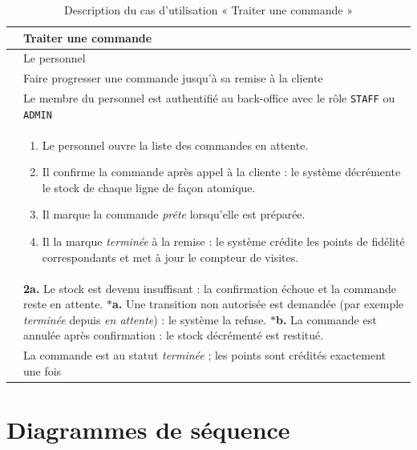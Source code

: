 \begin{table}[H]
\centering
\caption{Description du cas d'utilisation « Traiter une commande »}
\label{tab:cu-traiter}
\begin{tabularx}{\textwidth}{L{3.1cm} X}
\toprule
{} & Traiter une commande \\
\midrule
{} & Le personnel \\
 & Faire progresser une commande jusqu'à sa remise à la
cliente \\
 & Le membre du personnel est authentifié au back-office
avec le rôle \texttt{STAFF} ou \texttt{ADMIN} \\
 &
\begin{enumerate}[leftmargin=*,nosep]
  \item Le personnel ouvre la liste des commandes en attente.
  \item Il confirme la commande après appel à la cliente : le système
  décrémente le stock de chaque ligne de façon atomique.
  \item Il marque la commande \textit{prête} lorsqu'elle est préparée.
  \item Il la marque \textit{terminée} à la remise : le système crédite les
  points de fidélité correspondants et met à jour le compteur de visites.
\end{enumerate} \\
 &
\textbf{2a.} Le stock est devenu insuffisant : la confirmation échoue et la
commande reste en attente.\newline
\textbf{$\ast$a.} Une transition non autorisée est demandée (par exemple
\textit{terminée} depuis \textit{en attente}) : le système la refuse.\newline
\textbf{$\ast$b.} La commande est annulée après confirmation : le stock
décrémenté est restitué. \\
 & La commande est au statut \textit{terminée} ; les
points sont crédités exactement une fois \\
\bottomrule
\end{tabularx}
\end{table}

\section{Diagrammes de séquence}

